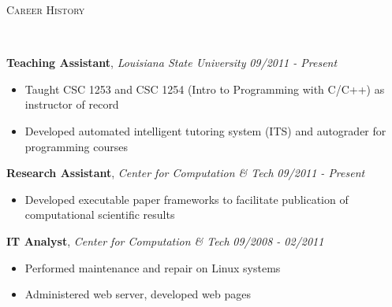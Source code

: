 \documentclass[9pt]{article}
\newenvironment{changemargin}[2]{%
  \begin{list}{}{%
    \setlength{\topsep}{0pt}%
    \setlength{\leftmargin}{#1}%
    \setlength{\rightmargin}{#2}%
    \setlength{\listparindent}{\parindent}%
    \setlength{\itemindent}{\parindent}%
    \setlength{\parsep}{\parskip}%
  }%
  \item[]}{\end{list}
}
\newcommand{\lineover}{
	\begin{changemargin}{-0.05in}{-0.05in}
		\vspace*{-8pt}
		\hrulefill \\
		\vspace*{-2pt}
	\end{changemargin}
}
\newcommand{\header}[1]{
	\begin{changemargin}{-0.5in}{-0.5in}
		\large \scshape{#1}\\
  	\lineover
	\end{changemargin}
}
\newenvironment{body} {
	\vspace*{-16pt}
	\begin{changemargin}{-0.25in}{-0.5in}
  }	
	{\end{changemargin}
}
\begin{document}
\vspace{24pt}
\header{Career History}
\vspace{16pt}
\begin{body}
	\textbf{Teaching Assistant}, \emph{Louisiana State University} \hfill \emph{09/2011 - Present}\\
	\vspace*{-4pt}
	\begin{itemize} \itemsep -0pt  
	  \item Taught CSC 1253 and CSC 1254 (Intro to Programming with C/C++) as instructor of record
		\item Developed automated intelligent tutoring system (ITS) and autograder for programming courses
	\end{itemize}
        \smallskip
	\textbf{Research Assistant}, \emph{Center for Computation \& Tech} \hfill \emph{09/2011 - Present}\\
	\vspace*{-4pt}
	\begin{itemize} \itemsep -0pt  
		\item Developed executable paper frameworks to facilitate publication of computational scientific results
	\end{itemize}
        \smallskip
	\textbf {IT Analyst}, \emph{Center for Computation \& Tech} \hfill \emph{09/2008 - 02/2011}\\
	\vspace*{-4pt}
	\begin{itemize} \itemsep -0pt
		\item Performed maintenance and repair on Linux systems
		\item Administered web server, developed web pages
	\end{itemize}
\end{body}
\end{document}
